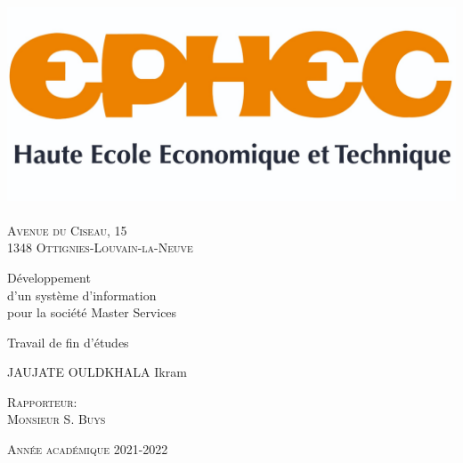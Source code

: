 \documentclass[french, 11pt, a4paper]{article}
\begin{document}
\singlespacing


\begin{titlepage}
\begin{center}

\includegraphics[width=15cm]{img/ephec.jpg}~\\
\textsc{Avenue du Ciseau, 15 \\ 1348 Ottignies-Louvain-la-Neuve} \\[1.5cm]

{\huge \bfseries \begin{spacing}{1.25}
  Développement \\ 
  d’un système d’information \\
  pour la société Master Services 
  \\[2cm]
  \end{spacing} 
} 

{\large 
  Travail de fin d'études
  \\[2cm]
}

{\LARGE 
JAUJATE OULDKHALA Ikram
}

\vspace*{\fill}
  
\end{center}

\begin{minipage}[t]{.5\textwidth}
  \textsc{\large Rapporteur:\\Monsieur S. Buys}
\end{minipage}
\begin{minipage}[br]{.5\textwidth}
  \textsc{\large Année académique 2021-2022}
\end{minipage}  

\end{titlepage}



\singlespacing
\newpage
{}
\renewcommand{\contentsname}{Table des matières}
\tableofcontents
\onehalfspacing
\end{document}

